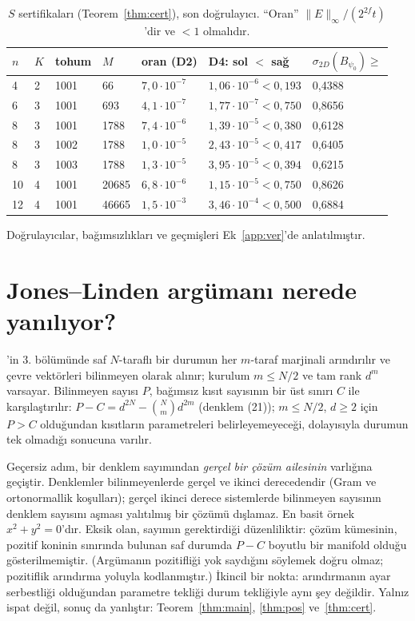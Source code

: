 \documentclass[aps,pra,onecolumn,superscriptaddress,nofootinbib,longbibliography,10pt]{revtex4-2}
\theoremstyle{definition}
\begin{document}
\begin{table}[h]
\caption{$S$ sertifikaları (Teorem~\ref{thm:cert}), son doğrulayıcı. ``Oran'' $\|E\|_\infty/(2^{2f}t)$'dir ve $<1$ olmalıdır.}\label{tab:S}
\begin{tabular}{lllllll}
\toprule
$n$ & $K$ & tohum & $M$ & oran (D2) & D4: sol $<$ sağ & $\sigma_{2D}(B_{\psi_0})\ge$\\
\midrule
4 & 2 & 1001 & 66 & $7{,}0\cdot10^{-7}$ & $1{,}06\cdot10^{-6}<0{,}193$ & 0{,}4388\\
6 & 3 & 1001 & 693 & $4{,}1\cdot10^{-7}$ & $1{,}77\cdot10^{-7}<0{,}750$ & 0{,}8656\\
8 & 3 & 1001 & 1788 & $7{,}4\cdot10^{-6}$ & $1{,}39\cdot10^{-5}<0{,}380$ & 0{,}6128\\
8 & 3 & 1002 & 1788 & $1{,}0\cdot10^{-5}$ & $2{,}43\cdot10^{-5}<0{,}417$ & 0{,}6405\\
8 & 3 & 1003 & 1788 & $1{,}3\cdot10^{-5}$ & $3{,}95\cdot10^{-5}<0{,}394$ & 0{,}6215\\
10 & 4 & 1001 & 20685 & $6{,}8\cdot10^{-6}$ & $1{,}15\cdot10^{-5}<0{,}750$ & 0{,}8626\\
12 & 4 & 1001 & 46665 & $1{,}5\cdot10^{-3}$ & $3{,}46\cdot10^{-4}<0{,}500$ & 0{,}6884\\
\bottomrule
\end{tabular}
\end{table}

Doğrulayıcılar, bağımsızlıkları ve geçmişleri Ek~\ref{app:ver}'de anlatılmıştır.

\section{Jones--Linden argümanı nerede yanılıyor?}\label{sec:JL}
\cite{JL05}'in 3. bölümünde saf $N$-taraflı bir durumun her $m$-taraf marjinali arındırılır ve çevre vektörleri bilinmeyen olarak alınır; kurulum $m\le N/2$ ve tam rank $d^m$ varsayar. Bilinmeyen sayısı $P$, bağımsız kısıt sayısının bir üst sınırı $C$ ile karşılaştırılır: $P-C=d^{2N}-\binom Nm d^{2m}$ (denklem (21)); $m\le N/2$, $d\ge2$ için $P>C$ olduğundan kısıtların parametreleri belirleyemeyeceği, dolayısıyla durumun tek olmadığı sonucuna varılır.

Geçersiz adım, bir denklem sayımından \emph{gerçel bir çözüm ailesinin} varlığına geçiştir. Denklemler bilinmeyenlerde gerçel ve ikinci derecedendir (Gram ve ortonormallik koşulları); gerçel ikinci derece sistemlerde bilinmeyen sayısının denklem sayısını aşması yalıtılmış bir çözümü dışlamaz. En basit örnek $x^2+y^2=0$'dır. Eksik olan, sayımın gerektirdiği düzenliliktir: çözüm kümesinin, pozitif koninin sınırında bulunan saf durumda $P-C$ boyutlu bir manifold olduğu gösterilmemiştir. (Argümanın pozitifliği yok saydığını söylemek doğru olmaz; pozitiflik arındırma yoluyla kodlanmıştır.) İkincil bir nokta: arındırmanın ayar serbestliği olduğundan parametre tekliği durum tekliğiyle aynı şey değildir. Yalnız ispat değil, sonuç da yanlıştır: Teorem~\ref{thm:main}, \ref{thm:pos} ve~\ref{thm:cert}.
\end{document}
